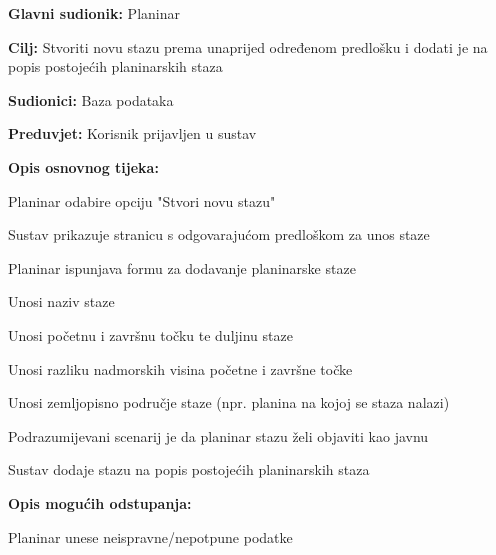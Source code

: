 			\noindent {}
			\begin{packed_item}
				
				\item \textbf{Glavni sudionik: }$ $Planinar$ $
				\item  \textbf{Cilj:} $ $Stvoriti novu stazu prema unaprijed određenom predlošku i dodati je na popis postojećih planinarskih staza$ $
				\item  \textbf{Sudionici:} $ $Baza podataka$ $
				\item  \textbf{Preduvjet:} $ $Korisnik prijavljen u sustav$ $
				\item  \textbf{Opis osnovnog tijeka:}
				
				\item[] \begin{packed_enum}
					
					\item $ $Planinar odabire opciju "Stvori novu stazu"$ $
					\item $ $Sustav prikazuje stranicu s odgovarajućom predloškom za unos staze$ $
					\item $ $Planinar ispunjava formu za dodavanje planinarske staze$ $
					\begin{packed_enum}
						\item Unosi naziv staze
						\item Unosi početnu i završnu točku te duljinu staze
						\item Unosi razliku nadmorskih visina početne i završne točke
						\item Unosi zemljopisno područje staze (npr. planina na kojoj se staza nalazi)
						\item Podrazumijevani scenarij je da planinar stazu želi objaviti kao javnu
					\end{packed_enum}	
					\item $ $Sustav dodaje stazu na popis postojećih planinarskih staza$ $
				\end{packed_enum}
				\item  \textbf{Opis mogućih odstupanja:}
				
				\item[] \begin{packed_item}
					
					\item[3.a] $ $Planinar unese neispravne/nepotpune podatke$ $
					\item[] \begin{packed_enum}
						

\end{packed_enum}
\end{packed_item}
\end{packed_item}
